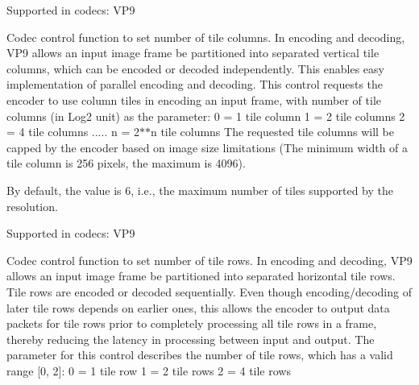\begin{Desc}
\begin{description}
Supported in codecs\+: V\+P9 \item[{\em 
V\+P9\+E\+\_\+\+S\+E\+T\+\_\+\+T\+I\+L\+E\+\_\+\+C\+O\+L\+U\+M\+NS\hypertarget{group__vp8__encoder_gga6deae3d561c838952552c3d3756322eca9c221dc99c51eb5e6304461aed9b5f5b}{}\label{group__vp8__encoder_gga6deae3d561c838952552c3d3756322eca9c221dc99c51eb5e6304461aed9b5f5b}
}]Codec control function to set number of tile columns. In encoding and decoding, V\+P9 allows an input image frame be partitioned into separated vertical tile columns, which can be encoded or decoded independently. This enables easy implementation of parallel encoding and decoding. This control requests the encoder to use column tiles in encoding an input frame, with number of tile columns (in Log2 unit) as the parameter\+: 0 = 1 tile column 1 = 2 tile columns 2 = 4 tile columns ..... n = 2$\ast$$\ast$n tile columns The requested tile columns will be capped by the encoder based on image size limitations (The minimum width of a tile column is 256 pixels, the maximum is 4096).

By default, the value is 6, i.\+e., the maximum number of tiles supported by the resolution.

Supported in codecs\+: V\+P9 \item[{\em 
V\+P9\+E\+\_\+\+S\+E\+T\+\_\+\+T\+I\+L\+E\+\_\+\+R\+O\+WS\hypertarget{group__vp8__encoder_gga6deae3d561c838952552c3d3756322eca5c6da58a82728ce850d0b2c9188f9fa2}{}\label{group__vp8__encoder_gga6deae3d561c838952552c3d3756322eca5c6da58a82728ce850d0b2c9188f9fa2}
}]Codec control function to set number of tile rows. In encoding and decoding, V\+P9 allows an input image frame be partitioned into separated horizontal tile rows. Tile rows are encoded or decoded sequentially. Even though encoding/decoding of later tile rows depends on earlier ones, this allows the encoder to output data packets for tile rows prior to completely processing all tile rows in a frame, thereby reducing the latency in processing between input and output. The parameter for this control describes the number of tile rows, which has a valid range \mbox{[}0, 2\mbox{]}\+: 0 = 1 tile row 1 = 2 tile rows 2 = 4 tile rows


\end{description}
\end{Desc}
